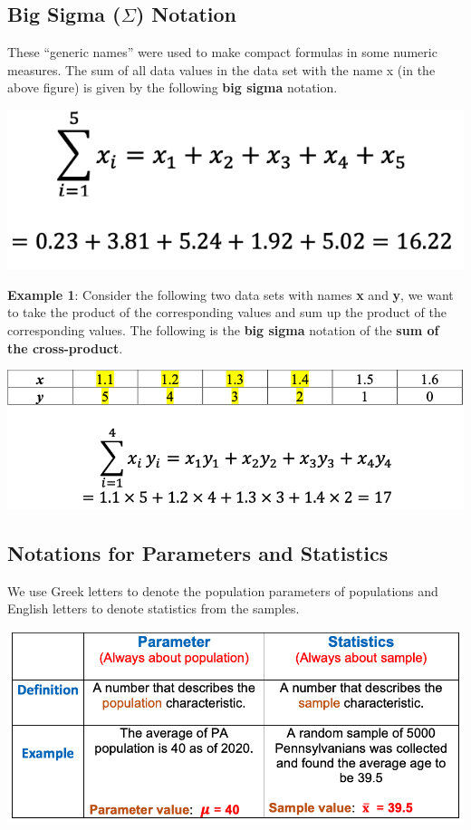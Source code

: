 \documentclass[
]{book}
\begin{document}
\hypertarget{big-sigma-sigma-notation}{%
\subsection{\texorpdfstring{Big Sigma (\(\Sigma\)) Notation}{Big Sigma (\textbackslash Sigma) Notation}}\label{big-sigma-sigma-notation}}

These ``generic names'' were used to make compact formulas in some numeric measures. The sum of all data values in the data set with the name x (in the above figure) is given by the following \textbf{big sigma} notation.

\begin{center}\includegraphics[width=0.5\linewidth]{week02/bigSigmaNotation} \end{center}

\textbf{Example 1}: Consider the following two data sets with names \textbf{x} and \textbf{y}, we want to take the product of the corresponding values and sum up the product of the corresponding values. The following is the \textbf{big sigma} notation of the \textbf{sum of the cross-product}.

\begin{center}\includegraphics[width=0.7\linewidth]{week02/crossProductNotation} \end{center}

\hypertarget{notations-for-parameters-and-statistics}{%
\subsection{Notations for Parameters and Statistics}\label{notations-for-parameters-and-statistics}}

We use Greek letters to denote the population parameters of populations and English letters to denote statistics from the samples.

\begin{center}\includegraphics[width=0.7\linewidth]{week02/samplePopMeans} \end{center}
\end{document}

